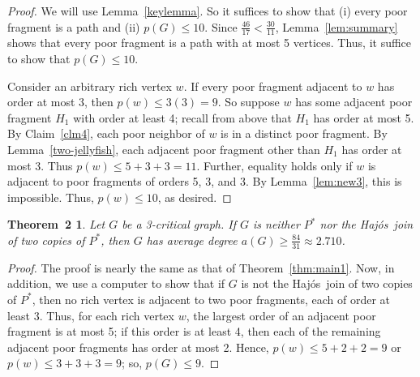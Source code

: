 \documentclass[12pt]{article}
\theoremstyle{plain}
\newtheorem*{mainthm2}{Theorem~2}
\theoremstyle{definition}
\theoremstyle{remark}
\def\hajos{Haj\'{o}s}
\begin{document}
\begin{proof}
We will use Lemma~\ref{keylemma}.  So it suffices to show that (i) every poor
fragment is a path and (ii) $p(G)\le 10$.
Since $\frac{46}{17}<\frac{30}{11}$, Lemma~\ref{lem:summary} shows that every
poor fragment is a path with at most 5 vertices.  Thus, it suffice to show that
$p(G)\le 10$.  

Consider an arbitrary rich vertex $w$.  If every poor fragment adjacent to $w$
has order at most 3, then $p(w)\le 3(3)=9$.  So suppose $w$ has some adjacent
poor fragment $H_1$ with order at least 4; recall from above that $H_1$ has
order at most 5.  By Claim~\ref{clm4}, each poor neighbor of $w$ is in a
distinct poor fragment.
By Lemma~\ref{two-jellyfish}, each adjacent poor fragment other than $H_1$ has
order at most 3.  Thus $p(w)\le 5+3+3=11$.  Further, equality
holds only if $w$ is adjacent to poor fragments of orders 5, 3, and 3.  By
Lemma~\ref{lem:new3}, this is impossible.  Thus, $p(w)\le 10$, as desired.
\end{proof}

\begin{mainthm2}
Let $G$ be a 3-critical graph.  If $G$ is neither $P^*$ nor the
\hajos\ join of two copies of $P^*$, then $G$ has average degree $a(G)\ge
\frac{84}{31}\approx 2.710$.
\end{mainthm2}

\begin{proof}
The proof is nearly the same as that of Theorem~\ref{thm:main1}.  Now, in
addition, we use a computer to show that if $G$ is not the \hajos\ join of two
copies of $P^*$, then no rich vertex is adjacent to two poor
fragments, each of order at least 3.  Thus, for each rich vertex $w$, the
largest order of an adjacent poor fragment is at most 5; if this order is at
least 4, then each of the remaining adjacent poor fragments has
order at most 2.  Hence, $p(w)\le 5+2+2=9$ or $p(w)\le 3+3+3=9$;
so, $p(G)\le 9$. %
\end{proof}
\end{document}
